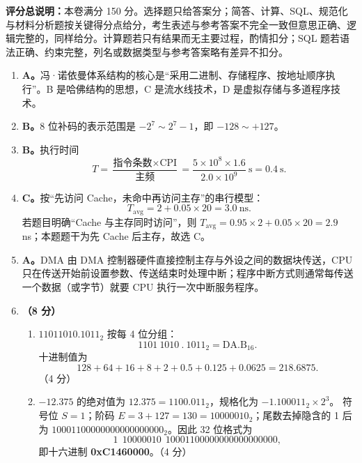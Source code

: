 \documentclass[a4paper,11pt]{article}
\begin{document}

\noindent\textbf{评分总说明：}本卷满分 150 分。选择题只给答案分；简答、计算、SQL、规范化与材料分析题按关键得分点给分，考生表述与参考答案不完全一致但意思正确、逻辑完整的，同样给分。计算题若只有结果而无主要过程，酌情扣分；SQL 题若语法正确、约束完整，列名或数据类型与参考答案略有差异不扣分。


\begin{enumerate}[start=1, label=\textbf{\arabic*.}, leftmargin=2.4em, itemsep=0.45em]

\item \textbf{A。}冯·诺依曼体系结构的核心是“采用二进制、存储程序、按地址顺序执行”。B 是哈佛结构的思想，C 是流水线技术，D 是虚拟存储与多道程序技术。

\item \textbf{B。}8 位补码的表示范围是 $-2^{7}\sim 2^{7}-1$，即 $-128\sim+127$。

\item \textbf{B。}执行时间
\[
T=\frac{\text{指令条数}\times \text{CPI}}{\text{主频}}
=\frac{5\times10^{8}\times1.6}{2.0\times10^{9}}\ \text{s}=0.4\ \text{s}.
\]

\item \textbf{C。}按“先访问 Cache，未命中再访问主存”的串行模型：
\[
T_{\text{avg}}=2+0.05\times20=3.0\ \text{ns}.
\]
若题目明确“Cache 与主存同时访问”，则 $T_{\text{avg}}=0.95\times2+0.05\times20=2.9$ ns；本题题干为先 Cache 后主存，故选 C。

\item \textbf{A。}DMA 由 DMA 控制器硬件直接控制主存与外设之间的数据块传送，CPU 只在传送开始前设置参数、传送结束时处理中断；程序中断方式则通常每传送一个数据（或字节）就要 CPU 执行一次中断服务程序。

\item \textbf{（8 分）}
\begin{enumerate}[label=（\arabic*）, leftmargin=2.2em, itemsep=1pt]
  \item $11011010.1011_2$ 按每 4 位分组：
  \[
  1101\ 1010\ .\ 1011_2=\text{DA.B}_{16}.
  \]
  十进制值为
  \[
  128+64+16+8+2+0.5+0.125+0.0625=218.6875.
  \]
  \hfill（4 分）

  \item $-12.375$ 的绝对值为 $12.375=1100.011_2$，规格化为 $-1.100011_2\times2^{3}$。
  符号位 $S=1$；阶码 $E=3+127=130=10000010_2$；尾数去掉隐含的 1 后为
  $10001100000000000000000_2$。因此 32 位格式为
  \[
  1\ \ 10000010\ \ 10001100000000000000000,
  \]
  即十六进制 \textbf{0xC1460000}。\hfill（4 分）
\end{enumerate}


\end{enumerate}
\end{document}
